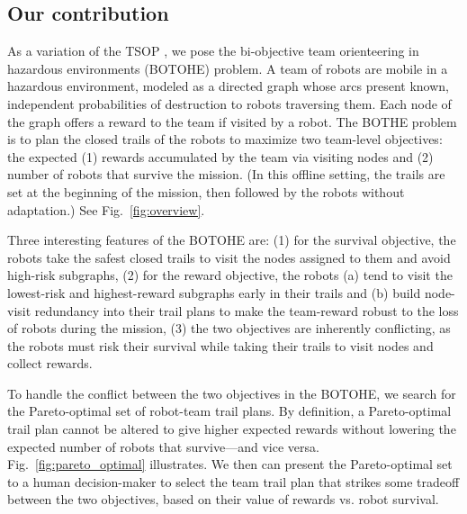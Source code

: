 \documentclass[11pt, oneside]{article}
\begin{document}
\subsection{Our contribution}
As a variation of the TSOP \cite{jorgensen2018team,jorgensen2017matroid,jorgensen2024matroid}, 
we pose the bi-objective team orienteering in hazardous environments (BOTOHE) problem. 
A team of robots are mobile in a hazardous environment, modeled as a directed graph whose arcs present known, independent probabilities of destruction to robots traversing them.
Each node of the graph offers a reward to the team if visited by a robot.
The BOTHE problem is to plan the closed trails of the robots to maximize two team-level objectives: the expected
(1) rewards accumulated by the team via visiting nodes and
(2) number of robots that survive the mission. 
(In this offline setting, the trails are set at the beginning of the mission, then followed by the robots without adaptation.)
See Fig.~\ref{fig:overview}.

Three interesting features of the BOTOHE are: 
(1) for the survival objective, the robots take the safest closed trails to visit the nodes assigned to them and avoid high-risk subgraphs,
(2) for the reward objective, the robots (a) tend to visit the lowest-risk and highest-reward subgraphs early in their trails and (b) build node-visit redundancy into their trail plans to make the team-reward robust to the loss of robots during the mission,
(3) the two objectives are inherently conflicting, as the robots must risk their survival while taking their trails to visit nodes and collect rewards.%

To handle the conflict between the two objectives in the BOTOHE, we search for the Pareto-optimal set of robot-team trail plans. By definition, a Pareto-optimal trail plan cannot be altered to give higher expected rewards without lowering the expected number of robots that survive---and vice versa. 
Fig.~\ref{fig:pareto_optimal} illustrates.
We then can present the Pareto-optimal set to a human decision-maker to select the team trail plan that strikes some tradeoff between the two objectives, based on their value of rewards vs. robot survival. 
\end{document}
